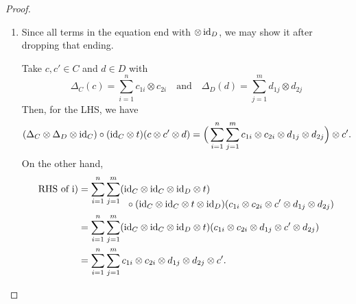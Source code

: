 \begin{proof}${}$
    \begin{enumerate}[\rm i)]
        \item Since all terms in the equation end with $\otimes\,\text{\rm id}_D$, we may show it after dropping that ending.
        
        Take $c,c'\in C$ and $d\in D$ with
        $$
            \Delta_C(c) = \sum_{i=1}^nc_{1i}\otimes c_{2i}
            \quad\text{and}\quad
            \Delta_D(d) = \sum_{j=1}^md_{1j}\otimes d_{2j}
        $$
        \normalsize
        Then, for the LHS, we have
        $$
            (\Delta_C\otimes\Delta_D\otimes\text{\rm id}_C)
                \circ(\text{\rm id}_C\otimes t)(c\otimes c'\otimes d)
                =\Big(\sum_{i=1}^n\sum_{j=1}^mc_{1i}\otimes c_{2i}
                    \otimes d_{1j}\otimes d_{2j}\Big)\otimes c'.
        $$
        \normalsize
        On the other hand,
        \begin{align*}
        \text{RHS of i)} &= \sum_{i=1}^n\sum_{j=1}^m
                (\text{\rm id}_C\otimes\text{\rm id}_C\otimes\text{\rm id}_D\otimes t)\\[-0.15in]
            &\quad\qquad\qquad\circ(\text{\rm id}_C\otimes\text{\rm id}_C\otimes t\otimes\text{\rm id}_D)
                (c_{1i}\otimes c_{2i}\otimes c'\otimes d_{1j}\otimes d_{2j})\\
            &=  \sum_{i=1}^n\sum_{j=1}^m
                (\text{\rm id}_C\otimes\text{\rm id}_C\otimes\text{\rm id}_D\otimes t)
                (c_{1i}\otimes c_{2i}\otimes d_{1j}\otimes c'\otimes d_{2j})\\
            &= \sum_{i=1}^n\sum_{j=1}^m
                c_{1i}\otimes c_{2i}\otimes d_{1j}\otimes d_{2j}\otimes c'.
        \end{align*}
        \normalsize


\end{enumerate}
\end{proof}
